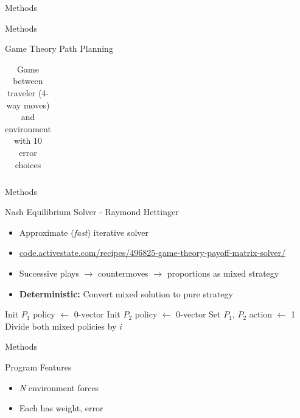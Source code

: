 \documentclass[xcolor=table, 9pt]{beamer}
\begin{document}
\begin{section}{Methods}
\begin{frame}{Methods}
\begin{block}{Game Theory Path Planning}
\begin{table}[]
\begin{tabular}{|l|l|l|l|l|l|l|l|l|l|l|}
\end{tabular}
\caption{Game between traveler (4-way moves) and environment with 10 error choices}
            \end{table}            
        \end{block}
    \end{frame}
    \begin{frame}{Methods}
        \begin{block}{Nash Equilibrium Solver - Raymond Hettinger}
            \begin{itemize}
                \item Approximate (\textit{fast}) iterative solver 
                \item \url{code.activestate.com/recipes/496825-game-theory-payoff-matrix-solver/}
                \item Successive plays $\rightarrow$ countermoves $\rightarrow$ proportions as mixed strategy
                \item \textbf{Deterministic:} Convert mixed solution to pure strategy
            \end{itemize}
            \begin{algorithm}[H]
            \caption[NashSolver]{\textbf{NashSolver:} Hettinger's 0-sum 2-player solver} 
            \label{alg:nashSolver}
            \SetAlgoVlined
            Init $P_1$ policy  $\leftarrow$ 0-vector\;
            Init $P_2$ policy  $\leftarrow$ 0-vector\;
            Set $P_1$, $P_2$ action $\leftarrow$ 1\;
            Divide both mixed policies by $i$\;
            \end{algorithm}
        \end{block}
    \end{frame} 
    \begin{frame}{Methods}
        \begin{block}{Program Features}
            \begin{itemize}
                \item \textit{N} environment forces
                \item Each has weight, error

\end{itemize}
\end{block}
\end{frame}
\end{section}
\end{document}
